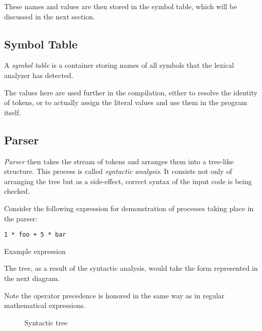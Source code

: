             These names and values are then stored in the symbol table, which will be discussed in the next section.

        \subsection{Symbol Table}

            A \emph{symbol table} is a container storing names of all symbols that the lexical analyzer has detected.\cite{DragonBook}

            The values here are used further in the compilation, either to resolve the identity of tokens, or to actually assign the literal values and use them in the program itself.

        \subsection{Parser}

            \emph{Parser} then takes the stream of tokens and arranges them into a tree-like structure. This process is called \emph{syntactic analysis}. It consists not only of arranging the tree but as a side-effect, correct syntax of the input code is being checked.

            Consider the following expression for demonstration of processes taking place in the parser:

            \begin{listing}
            \centering
            \texttt{1 * foo + 5 * bar}
            \caption{Example expression}\label{lst:expr}
            \end{listing}

            The tree, as a result of the syntactic analysis, would take the form represented in the next diagram.\cite{CompilerDesignInC}

            Note the operator precedence is honored in the same way as in regular mathematical expressions.

            \begin{figure}[H]
            \centering
            \caption{Syntactic tree} \label{fig:syntactic}
            \end{figure}


